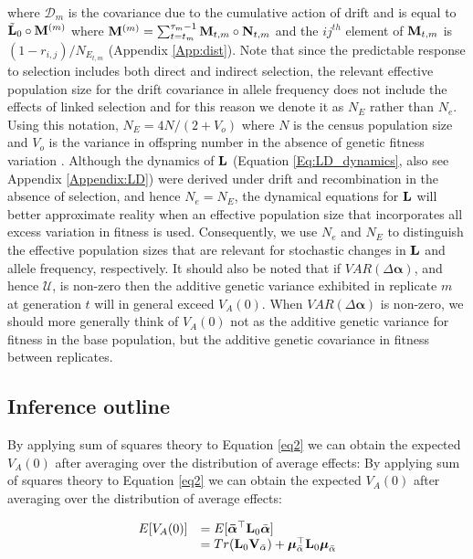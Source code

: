\documentclass[12pt]{article}
\begin{document}
\begin{bibunit}
where $\boldsymbol{\mathcal{D}}_m$ is the covariance due to the cumulative action of drift and is equal to $\tilde{\bf L}_{0}\circ{\bf M}^{(m)}$ where ${\bf M}^{(m)}=\sum_{t=t_m}^{\tau_m-1}{\bf M}_{t,m}\circ{\bf N}_{t,m}$ and the $ij^{th}$ element of ${\bf M}_{t,m}$ is $(1-r_{i,j})/N_{E_{t,m}}$ (Appendix \ref{App:dist}). Note that since the predictable response to selection includes both direct and indirect selection, the relevant effective population size for the drift covariance in allele frequency does not include the effects of linked selection and for this reason we denote it as $N_E$ rather than $N_e$. Using this notation, $N_E=4N/(2+V_o)$ where $N$ is the census population size and $V_o$ is the variance in offspring number in the absence of genetic fitness variation \citep{Wright.1938}. Although the dynamics of ${\bf L}$ (Equation \ref{Eq:LD_dynamics}, also see Appendix \ref{Appendix:LD}) were derived under drift and recombination in the absence of selection, and hence $N_e=N_E$, the dynamical equations for ${\bf L}$ will better approximate reality when an effective population size that incorporates all excess variation in fitness is used. Consequently, we use $N_e$ and $N_E$ to distinguish the effective population sizes that are relevant for stochastic changes in ${\bf L}$ and allele frequency, respectively. It should also be noted that if $VAR(\Delta {\boldsymbol \alpha})$, and hence $\boldsymbol{\mathcal{U}}$, is non-zero then the additive genetic variance exhibited in replicate $m$ at generation $t$ will in general exceed $V_A(0)$. When $VAR(\Delta {\boldsymbol \alpha})$ is non-zero,  we should more generally think of $V_A(0)$ not as the additive genetic variance for fitness in the base population, but the additive genetic covariance in fitness between replicates.

\subsection*{Inference outline}

By applying sum of squares theory \citep[page 355]{searle2006} to Equation \ref{eq2} we can obtain the expected $V_A(0)$ after averaging over the distribution of average effects:
By applying sum of squares theory \citep[page 355]{searle2006} to Equation \ref{eq2} we can obtain the expected $V_A(0)$ after averaging over the distribution of average effects:


\begin{equation} \label{eq6}
\begin{array}{rl}
E[V_A(0)] &= E[\boldsymbol{\bar \alpha}^{\top}\textbf{L}_0\bar{\boldsymbol{\alpha}}]\\
&= Tr(\textbf{L}_0{\bf V}_{\bar{\alpha}}) + \boldsymbol{\mu}_{\bar{\alpha}}^{\top}\textbf{L}_0\boldsymbol{\mu}_{\bar{\alpha}}\\
\end{array}
\end{equation}


\end{bibunit}
\end{document}
